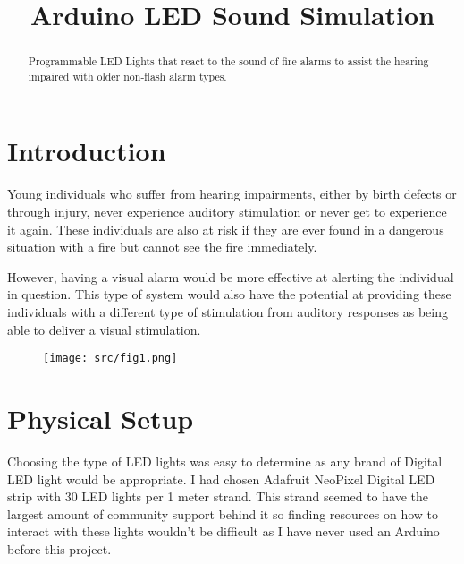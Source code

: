 \documentclass[conference]{IEEEtran}
\begin{document}
\title{Arduino LED Sound Simulation\\
}

\author{
}

\maketitle

\begin{abstract}
Programmable LED Lights that react to the sound of fire alarms to assist the hearing impaired with older non-flash alarm types.
\end{abstract}


\section{Introduction}
Young individuals who suffer from hearing impairments, either by birth defects or through injury, never experience auditory stimulation or never get to experience it again. These individuals are also at risk if they are ever found in a dangerous situation with a fire but cannot see the fire immediately.

However, having a visual alarm would be more effective at alerting the individual in question. This type of system would also have the potential at providing these individuals with a different type of stimulation from auditory responses as being able to deliver a visual stimulation.

\begin{figure}[H]
	\centering
	\texttt{[image: src/fig1.png]}
\end{figure}

\section{Physical Setup}
Choosing the type of LED lights was easy to determine as any brand of Digital LED light would be appropriate. I had chosen Adafruit NeoPixel Digital LED strip with 30 LED lights per 1 meter strand. This strand seemed to have the largest amount of community support behind it so finding resources on how to interact with these lights wouldn’t be difficult as I have never used an Arduino before this project.
\end{document}
